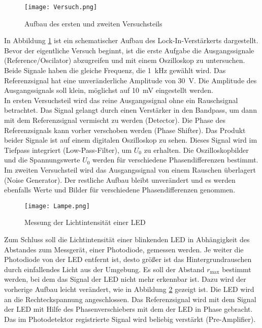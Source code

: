 \begin{figure}[h!] 
	\texttt{[image: Versuch.png]}
\caption[Aufbau des ersten und zweiten versuchteils]{Aufbau des ersten und zweiten Versuchsteils \footnotemark}
	\label{versuch}
\end{figure}	

In Abbildung \ref{versuch} ist ein schematischer Aufbau des Lock-In-Verstärkerts dargestellt.  \\
Bevor der eigentliche Versuch beginnt, ist die erste Aufgabe die Ausgangssignale (Reference/Oscilator) abzugreifen und mit einem Oszilloskop zu untersuchen. Beide Signale haben die gleiche Frequenz, die  \SI{1}{\kilo\hertz} gewählt wird. Das Referenzsignal hat eine unveränderliche Amplitude von \SI{30}{\volt}. Die Amplitude des Ausgangssignals soll klein, möglichst auf \SI{10}{\milli\volt} eingestellt werden. \\
In ersten Versuchsteil wird das reine Ausgangssignal ohne ein Rauschsignal betrachtet. Das Signal gelangt durch einen Verstärker in den Bandpass, um dann mit dem Referenzsignal vermischt zu werden (Detector). Die Phase des Referenzsignals kann vorher verschoben werden (Phase Shifter). Das Produkt beider Signale ist auf einem digitalen Oszilloskop zu sehen. Dieses Signal wird im Tiefpass integriert (Low-Pass-Filter), um $U_0$ zu erhalten. Die Oszilloskopbilder und die Spannungswerte $U_0$ werden für verschiedene Phasendifferenzen bestimmt. \\
Im zweiten Versuchsteil wird das Ausgangssignal von einem Rauschen überlagert (Noise Generator). Der restliche Aufbau bleibt unverändert und es werden ebenfalls Werte und Bilder für verschiedene Phasendifferenzen genommen. \\
\begin{figure}[h!]
	\texttt{[image: Lampe.png]}
	\caption{Messung der Lichtintensität einer LED\protect\footnotemark}
	\label{lampe}
\end{figure}	
	
Zum Schluss soll die Lichtintensität einer blinkenden LED in Abhängigkeit des Abstandes zum Messgerät, einer Photodiode, gemessen werden. Je weiter die Photodiode von der LED entfernt ist, desto größer ist das Hintergrundrauschen durch einfallendes Licht aus der Umgebung. Es soll der Abstand $r_\text{max}$ bestimmt werden, bei dem das Signal der LED nicht mehr erkennbar ist. Dazu wird der vorherige Aufbau leicht verändert, wie in Abbildung \ref{lampe} gezeigt ist. Die LED wird an die Rechteckspannung angeschlossen. Das Referenzsignal wird mit dem Signal der LED mit Hilfe des Phasenverschiebers  mit dem der LED in Phase gebracht. Das im Photodetektor registrierte Signal wird beliebig verstärkt (Pre-Amplifier).
